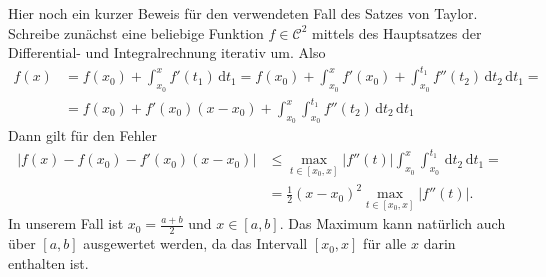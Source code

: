 \documentclass[english, parskip=full]{scrartcl}
\newcommand{\intx}{}
\newcommand{\kla}{}
\begin{document}


Hier noch ein kurzer Beweis für den verwendeten Fall des Satzes von Taylor.
Schreibe zunächst eine beliebige Funktion $f\in\mathcal{C}^2$ mittels des Hauptsatzes der Differential- und Integralrechnung iterativ um.
Also 
\begin{align}
f(x)&=f(x_0)+\intx\int_{x_0}^{x}f'(t_1)\, \mathrm{d}t_1=f(x_0)+\intx\int_{x_0}^{x}f'(x_0)+\intx\int_{x_0}^{t_1}f''(t_2)\, \mathrm{d}t_2\, \mathrm{d}t_1=\\
&=f(x_0)+f'(x_0)(x-x_0)+\intx\int_{x_0}^{x}\intx\int_{x_0}^{t_1}f''(t_2)\, \mathrm{d}t_2\, \mathrm{d}t_1
\end{align}
Dann gilt für den Fehler
\begin{align}
\left\vert f(x)-f(x_0)-f'(x_0)(x-x_0)\right\vert&\le \max_{t\in [x_0,x]}\left\vert f''(t)\right\vert \intx\int_{x_0}^{x}\intx\int_{x_0}^{t_1}\, \mathrm{d}t_2\, \mathrm{d}t_1=\\
&=\frac{1}{2}(x-x_0)^2\max_{t\in [x_0,x]}\left\vert f''(t)\right\vert.
\end{align}
In unserem Fall ist $x_0=\frac{a+b}{2}$ und $x\in [a,b]$.
Das Maximum kann natürlich auch über $[a,b]$ ausgewertet werden, da das Intervall $[x_0,x]$ für alle $x$ darin enthalten ist.
\end{document}

